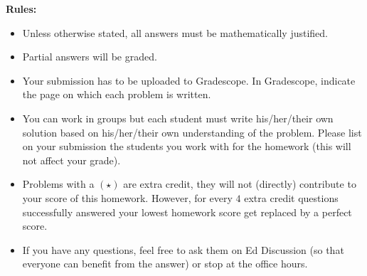 \noindent\textbf{Rules:}
{\small
	\begin{itemize}
		\item Unless otherwise stated, all answers must be mathematically justified.
		\item Partial answers will be graded. 
		\item Your submission has to be uploaded to Gradescope. In Gradescope, indicate the page on which each problem is written.
		\item You can work in groups but each student must write his/her/their own solution based on his/her/their own understanding of the problem. Please list on your submission the students you work with for the homework (this will not affect your grade).
		\item Problems with a $(\star)$ are extra credit, they will not (directly) contribute to your score of this homework. However, for every $4$ extra credit questions successfully answered your lowest homework score get replaced by a perfect score.
		\item If you have any questions, feel free to ask them on Ed Discussion (so that everyone can benefit from the answer) or stop at the office hours.
	\end{itemize}
}
